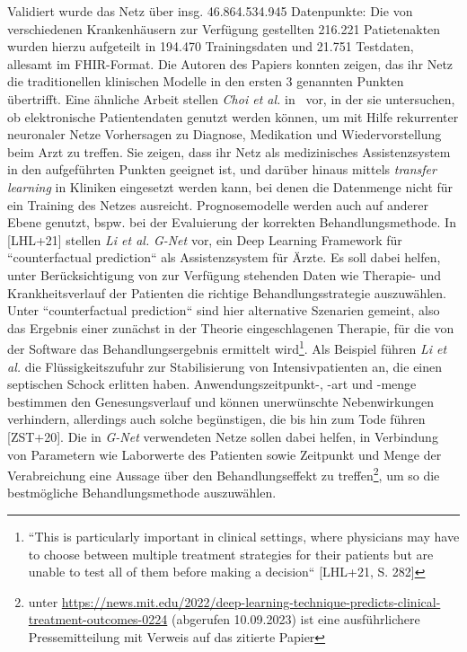 Validiert wurde das Netz über insg. 46.864.534.945 Datenpunkte: Die von verschiedenen Krankenhäusern zur Verfügung gestellten 216.221 Patietenakten wurden hierzu aufgeteilt in 194.470 Trainingsdaten und 21.751 Testdaten, allesamt im FHIR-Format. Die Autoren des Papiers konnten zeigen, das ihr Netz die traditionellen klinischen Modelle in den ersten 3 genannten Punkten übertrifft. Eine ähnliche Arbeit stellen \textit{Choi et al.} in~\cite{CBS+16} vor, in der sie untersuchen, ob elektronische Patientendaten genutzt werden können, um mit Hilfe rekurrenter neuronaler Netze Vorhersagen zu Diagnose, Medikation und Wiedervorstellung beim Arzt zu treffen. Sie zeigen, dass ihr Netz als medizinisches Assistenzsystem in den aufgeführten Punkten geeignet ist, und darüber hinaus mittels \textit{transfer learning} in Kliniken eingesetzt werden kann, bei denen die Datenmenge nicht für ein Training des Netzes ausreicht.
Prognosemodelle werden auch auf anderer Ebene genutzt, bspw. bei der Evaluierung der korrekten Behandlungsmethode. In [LHL+21] stellen \textit{Li et al.} \textit{G-Net} vor, ein Deep Learning Framework für ``counterfactual prediction`` als Assistenzsystem für Ärzte. Es soll dabei helfen, unter Berücksichtigung von zur Verfügung stehenden Daten wie Therapie- und Krankheitsverlauf der Patienten die richtige Behandlungsstrategie auszuwählen. Unter ``counterfactual prediction`` sind hier alternative Szenarien gemeint, also das Ergebnis einer zunächst in der Theorie eingeschlagenen Therapie, für die von der Software das Behandlungsergebnis ermittelt wird\footnote{
    ``This is particularly important in clinical settings, where physicians may have to choose between multiple treatment strategies for their patients but are unable to test all of them before making a decision``  [LHL+21, S. 282]
}. Als Beispiel führen \textit{Li et al.} die Flüssigkeitszufuhr zur Stabilisierung von Intensivpatienten an, die einen septischen Schock erlitten haben. Anwendungszeitpunkt-, -art und -menge bestimmen den Genesungsverlauf und können unerwünschte Nebenwirkungen verhindern, allerdings auch solche begünstigen, die bis hin zum Tode führen [ZST+20]. Die in \textit{G-Net} verwendeten Netze sollen dabei helfen, in Verbindung von Parametern wie Laborwerte des Patienten sowie Zeitpunkt und Menge der Verabreichung eine Aussage über den Behandlungseffekt zu treffen\footnote{
    unter \url{https://news.mit.edu/2022/deep-learning-technique-predicts-clinical-treatment-outcomes-0224} (abgerufen 10.09.2023) ist eine ausführlichere Pressemitteilung mit Verweis auf das zitierte Papier
}, um so die bestmögliche Behandlungsmethode auszuwählen.
